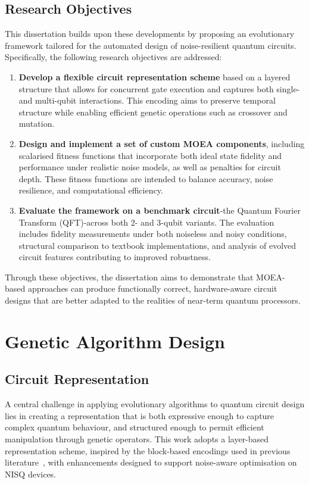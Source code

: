 \documentclass[11pt,a4paper]{article}
\begin{document}
\subsection{Research Objectives}
This dissertation builds upon these developments by proposing an evolutionary framework tailored for the automated design of noise-resilient quantum circuits. Specifically, the following research objectives are addressed:

\begin{enumerate}
    \item \textbf{Develop a flexible circuit representation scheme} based on a layered structure that allows for concurrent gate execution and captures both single- and multi-qubit interactions. This encoding aims to preserve temporal structure while enabling efficient genetic operations such as crossover and mutation.

    \item \textbf{Design and implement a set of custom MOEA components}, including scalarised fitness functions that incorporate both ideal state fidelity and performance under realistic noise models, as well as penalties for circuit depth. These fitness functions are intended to balance accuracy, noise resilience, and computational efficiency.

    \item \textbf{Evaluate the framework on a benchmark circuit}-the Quantum Fourier Transform (QFT)-across both 2- and 3-qubit variants. The evaluation includes fidelity measurements under both noiseless and noisy conditions, structural comparison to textbook implementations, and analysis of evolved circuit features contributing to improved robustness.
\end{enumerate}

Through these objectives, the dissertation aims to demonstrate that MOEA-based approaches can produce functionally correct, hardware-aware circuit designs that are better adapted to the realities of near-term quantum processors.

%
%
\section{Genetic Algorithm Design}
\subsection{Circuit Representation}
A central challenge in applying evolutionary algorithms to quantum circuit design lies in creating a representation that is both expressive enough to capture complex quantum behaviour, and structured enough to permit efficient manipulation through genetic operators. This work adopts a layer-based representation scheme, inspired by the block-based encodings used in previous literature~\cite{Lukac2002EvolvingQC}, with enhancements designed to support noise-aware optimisation on NISQ devices.\newline
\end{document}
